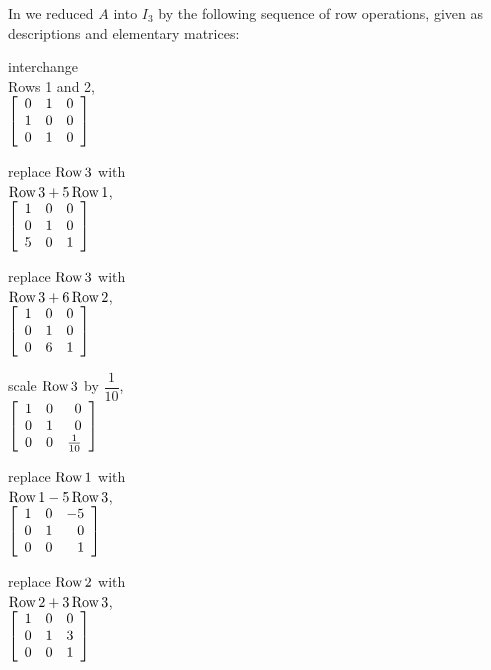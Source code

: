 \begin{Exam} In  we reduced $A$ into $I_3$ by the following sequence of row operations, given
as descriptions and elementary matrices:
\begin{multicols}{4}
\begin{center}
    interchange\\ 
    Rows 1 and 2,\\
$\mtx{rrr}{0&1&0\\1&0&0\\0&1&0}$
\end{center}\columnbreak

\begin{center}
replace $\row 3$ with\\ $\row 3 +5\row 1$,\\
$\mtx{rrr}{1&0&0\\0&1&0\\5&0&1}$
\end{center}\columnbreak

\begin{center}
replace $\row 3$ with\\ $\row 3 +6\row 2$,\\
$\mtx{rrr}{1&0&0\\0&1&0\\0&6&1}$
\end{center}\columnbreak

\begin{center}
scale $\row 3$ by $\dfrac{1}{10}$,\\
$\mtx{rcr}{1&0&0\\0&1&0\\0&0&\frac{1}{10}}$
\end{center}
\end{multicols}

\begin{multicols}{3}
\begin{center}
replace $\row 1$ with\\ $\row 1 -5\row 3$,\\
$\mtx{rrr}{1&0&-5\\0&1&0\\0&0&1}$
\end{center}\columnbreak

\begin{center}
replace $\row 2$ with\\ $\row 2 +3\row 3$,\\
$\mtx{rrr}{1&0&0\\0&1&3\\0&0&1}$
\end{center}\columnbreak


\end{multicols}
\end{Exam}

